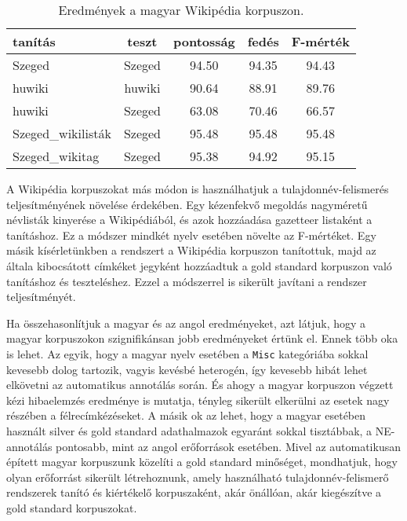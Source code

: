 \documentclass{llncs}
\begin{document}
\begin{table}[ht]
\begin{center}
\begin{tabular}{lcccc}
\toprule 
\bf tanítás & \bf teszt & \bf pontosság & \bf fedés & \bf F-mérték \\ 
\midrule
Szeged & Szeged & 94.50 & 94.35 & 94.43 \\
huwiki & huwiki & 90.64 & 88.91 &  89.76 \\
huwiki & Szeged & 63.08 & 70.46 & 66.57 \\
Szeged\_wikilisták & Szeged & 95.48 & 95.48 & 95.48 \\
Szeged\_wikitag & Szeged & 95.38 & 94.92 & 95.15 \\
\bottomrule
\end{tabular}
\end{center}
\caption{Eredmények a magyar Wikipédia korpuszon.}
\label{tab:huresults}
\end{table}

A Wikipédia korpuszokat más módon is használhatjuk a tulajdonnév-felismerés teljesítményének növelése érdekében. Egy kézenfekvő megoldás nagyméretű névlisták kinyerése a Wikipédiából, és azok hozzáadása gazetteer listaként a tanításhoz. Ez a módszer mindkét nyelv esetében növelte az F-mértéket. Egy másik kísérletünkben a rendszert a Wikipédia korpuszon tanítottuk, majd az általa kibocsátott címkéket jegyként hozzáadtuk a gold standard korpuszon való tanításhoz és teszteléshez. Ezzel a módszerrel is sikerült javítani a rendszer teljesítményét. 

Ha összehasonlítjuk a magyar és az angol eredményeket, azt látjuk, hogy a magyar korpuszokon szignifikánsan jobb eredményeket értünk el. Ennek több oka is lehet. Az egyik, hogy a magyar nyelv esetében a \texttt{Misc} kategóriába sokkal kevesebb dolog tartozik, vagyis kevésbé heterogén, így kevesebb hibát lehet elkövetni az automatikus annotálás során. És ahogy a magyar korpuszon végzett kézi hibaelemzés eredménye is mutatja, tényleg sikerült elkerülni az esetek nagy részében a félrecímkézéseket. A másik ok az lehet, hogy a magyar esetében használt silver és gold standard adathalmazok egyaránt sokkal tisztábbak, a NE-annotálás pontosabb, mint az angol erőforrások esetében. Mivel az automatikusan épített magyar korpuszunk közelíti a gold standard minőséget, mondhatjuk, hogy olyan erőforrást sikerült létrehoznunk, amely használható tulajdonnév-felismerő rendszerek tanító és kiértékelő korpuszaként, akár önállóan, akár kiegészítve a gold standard korpuszokat. 
\end{document}
